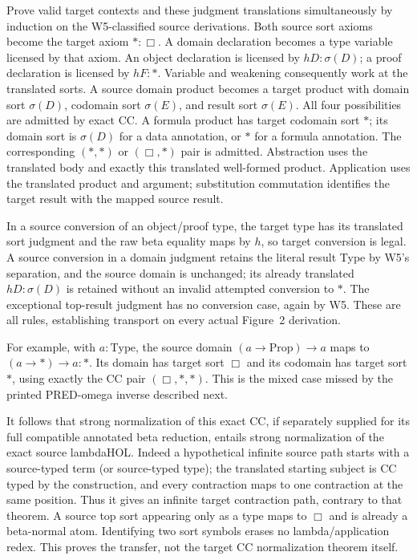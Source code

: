 Prove valid target contexts and these judgment translations simultaneously
by induction on the W5-classified source derivations. Both source sort
axioms become the target axiom \(\ast:\Box\). A domain declaration
becomes a type variable licensed by that axiom. An object declaration
is licensed by \(hD:\sigma(D)\); a proof declaration is licensed
by \(hF:\ast\). Variable and weakening consequently work at the
translated sorts. A source domain product becomes a target product with
domain sort \(\sigma(D)\), codomain sort \(\sigma(E)\), and result
sort \(\sigma(E)\). All four possibilities are admitted by exact CC.
A formula product has target codomain sort \(\ast\); its domain
sort is \(\sigma(D)\) for a data annotation, or \(\ast\) for a
formula annotation. The corresponding \((\ast,\ast)\) or
\((\Box,\ast)\) pair is admitted. Abstraction uses the translated
body and exactly this translated well-formed product. Application uses
the translated product and argument; substitution commutation identifies
the target result with the mapped source result.

In a source conversion of an object/proof type, the target type has its
translated sort judgment and the raw beta equality maps by \(h\), so
target conversion is legal. A source conversion in a domain judgment
retains the literal result Type by W5's separation, and the source domain
is unchanged; its already translated \(hD:\sigma(D)\) is retained
without an invalid attempted conversion to \(\ast\). The exceptional
top-result judgment has no conversion case, again by W5. These are all
rules, establishing transport on every actual Figure~2 derivation.

For example, with \(a:\mathrm{Type}\), the source domain
\((a\to\mathrm{Prop})\to a\) maps to
\((a\to\ast)\to a:\ast\). Its domain has target sort \(\Box\)
and its codomain has target sort \(\ast\), using exactly the CC pair
\((\Box,\ast,\ast)\). This is the mixed case missed by the printed
PRED-omega inverse described next.

It follows that strong normalization of this exact CC, if separately
supplied for its full compatible annotated beta reduction, entails strong
normalization of the exact source lambdaHOL. Indeed a hypothetical
infinite source path starts with a source-typed term (or source-typed
type); the translated starting subject is CC typed by the construction,
and every contraction maps to one contraction at the same position.
Thus it gives an infinite target contraction path, contrary to that
theorem. A source top sort appearing only as a type maps to \(\Box\)
and is already a beta-normal atom. Identifying two sort symbols erases
no lambda/application redex. This proves the transfer, not the target
CC normalization theorem itself.

